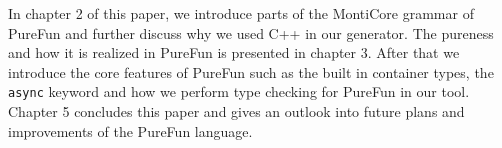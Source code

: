 In chapter 2 of this paper, we introduce parts of the MontiCore grammar of PureFun and further discuss why we used C++ in our generator. The pureness and how it is realized in PureFun is presented in chapter 3. After that we introduce the core features of PureFun such as the built in container types, the \lstinline{async}{} keyword and how we perform type checking for PureFun in our tool. Chapter 5 concludes this paper and gives an outlook into future plans and improvements of the PureFun language.